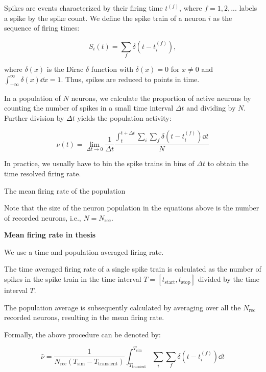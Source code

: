 Spikes are events characterized by their firing time $t^{(f)}$, where $f=1, 2, ...$ labels a spike by the spike count. We define the spike train of a neuron $i$ as the sequence of firing times: 

\begin{equation}
    S_i(t) = \sum_f \delta \left(t - t_i^{(f)} \right),
\end{equation}

where $\delta(x)$ is the Dirac $\delta$ function with $\delta(x)=0$ for $x \neq 0$ and $\int_{-\infty}^\infty \delta (x) \dd{x} = 1$. Thus, spikes are reduced to points in time. 

In a population of $N$ neurons, we calculate the proportion of active neurons by counting the number of spikes in a small time interval $\Delta t$ and dividing by $N$. Further division by $\Delta t$ yields the population activity:

\begin{equation}
    \nu (t) = \lim_{\Delta t \to 0} \frac{1}{\Delta t} \frac{\int_{t}^{t + \Delta t} \sum_i \sum_f \delta \left(t - t_i^{(f)} \right) \dd{t}}{N}
\end{equation} 

In practice, we usually have to bin the spike trains in bins of $\Delta t$ to obtain the time resolved firing rate. 

The mean firing rate of the population  


Note that the size of the neuron population in the equations above is the number of recorded neurons, i.e., $N = N_\mathrm{rec}$.

\textbf{Mean firing rate in thesis}

We use a time and population averaged firing rate. 

The time averaged firing rate of a single spike train is calculated as the number of spikes in the spike train in the time interval $T = [t_\mathrm{start}, t_\mathrm{stop}]$ divided by the time interval $T$. 

The population average is subsequently calculated by averaging over all the $N_\mathrm{rec}$ recorded neurons, resulting in the mean firing rate.  

Formally, the above procedure can be denoted by: 

\begin{equation}
    \bar{\nu} = \frac{1}{N_\mathrm{rec} \left(T_\mathrm{sim} - T_\mathrm{transient}\right)} \int_{T_\mathrm{transient}}^{T_\mathrm{sim}} \sum_i \sum_f \delta \left(t - t_i^{(f)} \right) \dd{t}
\end{equation}

